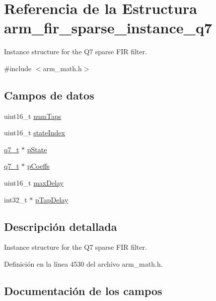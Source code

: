 \hypertarget{structarm__fir__sparse__instance__q7}{}\section{Referencia de la Estructura arm\+\_\+fir\+\_\+sparse\+\_\+instance\+\_\+q7}
\label{structarm__fir__sparse__instance__q7}


Instance structure for the Q7 sparse F\+IR filter.  




{\ttfamily \#include $<$arm\+\_\+math.\+h$>$}

\subsection*{Campos de datos}
\begin{DoxyCompactItemize}
\item 
uint16\+\_\+t \hyperlink{structarm__fir__sparse__instance__q7_a751941891e47f522a7f5375fe8990aac}{num\+Taps}
\item 
uint16\+\_\+t \hyperlink{structarm__fir__sparse__instance__q7_a566a0cb53437e48b9a3bf18e5b03d8aa}{state\+Index}
\item 
\hyperlink{arm__math_8h_ae541b6f232c305361e9b416fc9eed263}{q7\+\_\+t} $\ast$ \hyperlink{structarm__fir__sparse__instance__q7_aa8f67102521b620af6f259afdcf29785}{p\+State}
\item 
\hyperlink{arm__math_8h_ae541b6f232c305361e9b416fc9eed263}{q7\+\_\+t} $\ast$ \hyperlink{structarm__fir__sparse__instance__q7_a54407554b4fe7bbbb43924e4eea45e7f}{p\+Coeffs}
\item 
uint16\+\_\+t \hyperlink{structarm__fir__sparse__instance__q7_ab25f4ee7550e6d92acff77ada283733f}{max\+Delay}
\item 
int32\+\_\+t $\ast$ \hyperlink{structarm__fir__sparse__instance__q7_adec00b3793ab4f08edfeb4ea6a9eb6e6}{p\+Tap\+Delay}
\end{DoxyCompactItemize}


\subsection{Descripción detallada}
Instance structure for the Q7 sparse F\+IR filter. 

Definición en la línea 4530 del archivo arm\+\_\+math.\+h.



\subsection{Documentación de los campos}
